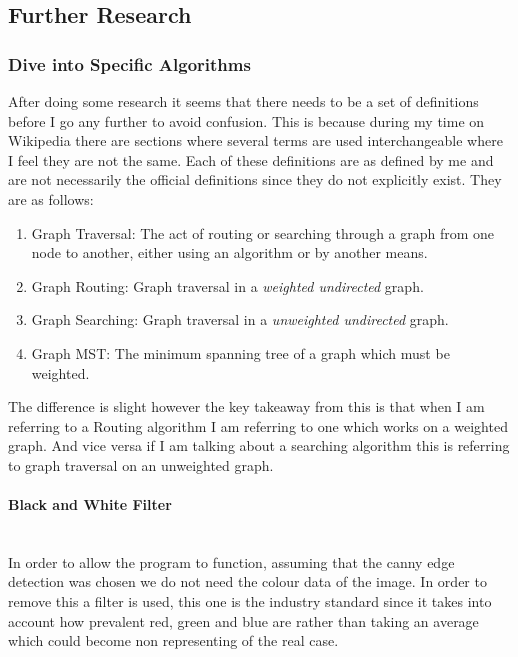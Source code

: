 \begin{flushleft}
        \subsection{Further Research}
            \subsubsection{Dive into Specific Algorithms}
            After doing some research it seems that there needs to be a set of definitions before I go any further to avoid confusion. This is because during my time on Wikipedia there are sections
            where several terms are used interchangeable where I feel they are not the same. Each of these definitions are as defined by me and are not necessarily the official definitions since they 
            do not explicitly exist. They are as follows: \\ \bk
            \begin{enumerate}
                \item Graph Traversal: The act of routing or searching through a graph from one node to another, either using an algorithm or by another means.
                \item Graph Routing: Graph traversal in a \emph{weighted undirected} graph.
                \item Graph Searching: Graph traversal in a \emph{unweighted undirected} graph.
                \item Graph MST: The minimum spanning tree of a graph which must be weighted.
            \end{enumerate}

            \bk
            The difference is slight however the key takeaway from this is that when I am referring to a Routing algorithm I am referring to one which works on a weighted graph. And vice versa if I am 
            talking about a searching algorithm this is referring to graph traversal on an unweighted graph. \\ \bk

            \paragraph{Black and White Filter}\mbox{} \\
            In order to allow the program to function, assuming that the canny edge detection was chosen we do not need the colour data of the image. In order to remove this a filter is used, this one is the
            industry standard since it takes into account how prevalent red, green and blue are rather than taking an average which could become non representing of the real case. \\ \bk
            

\end{flushleft}
